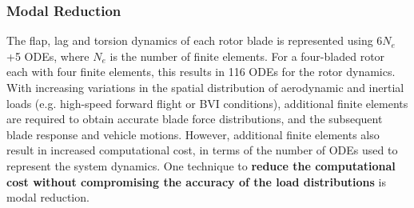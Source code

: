 \subsubsection{Modal Reduction}
\label{sec:modes}
The flap, lag and torsion dynamics of each rotor blade is represented using 6$N_e$+5 ODEs, where $N_e$ is the number of finite elements. For a four-bladed rotor each with four finite elements, this results in 116 ODEs for the rotor dynamics. With increasing variations in the spatial distribution of aerodynamic and inertial loads (e.g. high-speed forward flight or BVI conditions), additional finite elements are required to obtain accurate blade force distributions, and the subsequent blade response and vehicle motions. However, additional finite elements also result in increased computational cost, in terms of the number of ODEs used to represent the system dynamics. One technique to \textbf{reduce the computational cost without compromising the accuracy of the load distributions }is modal reduction.

